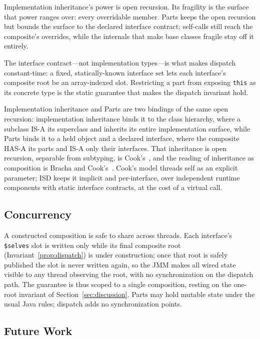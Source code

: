 \documentclass[sigplan,10pt,review,anonymous]{acmart}
\theoremstyle{acmplain}
\newcommand{\code}[1]{\texttt{#1}}
\begin{document}
Implementation inheritance's power is open recursion. Its fragility is the surface that power ranges over: every overridable member. Parts keeps the open recursion but bounds the surface to the declared interface contract; self-calls still reach the composite's overrides, while the internals that make base classes fragile stay off it entirely.

The interface contract---not implementation types---is what makes dispatch constant-time: a fixed, statically-known interface set lets each interface's composite root be an array-indexed slot. Restricting a part from exposing \code{this} as its concrete type is the static guarantee that makes the dispatch invariant hold.

Implementation inheritance and Parts are two bindings of the same open
recursion: implementation inheritance binds it to the class hierarchy, where a
subclass IS-A its superclass and inherits its entire implementation surface,
while Parts binds it to a held object and a declared interface, where the
composite HAS-A its parts and IS-A only their interfaces. That inheritance
is open recursion, separable from subtyping, is
Cook's~\cite{cookpalsberg1989,cook1990}, and the reading of inheritance as
composition is Bracha and Cook's~\cite{bracha1990}. Cook's model threads self as
an explicit parameter; ISD keeps it implicit and per-interface, over independent
runtime components with static interface contracts, at the cost of a virtual call.

\subsection{Concurrency}

A constructed composition is safe to share across threads. Each interface's
\code{\$selves} slot is written only while its final composite root
(Invariant~\ref{prop:dispatch}) is under construction; once that root is safely
published the slot is never written again, so the JMM makes all wired state
visible to any thread observing the root, with no synchronization on the dispatch
path. The guarantee is thus scoped to a single composition, resting on the
one-root invariant of Section~\ref{sec:discussion}. Parts may hold mutable
state under the usual Java rules; dispatch adds no synchronization points.

\subsection{Future Work}
\label{sec:futurework}
\end{document}
